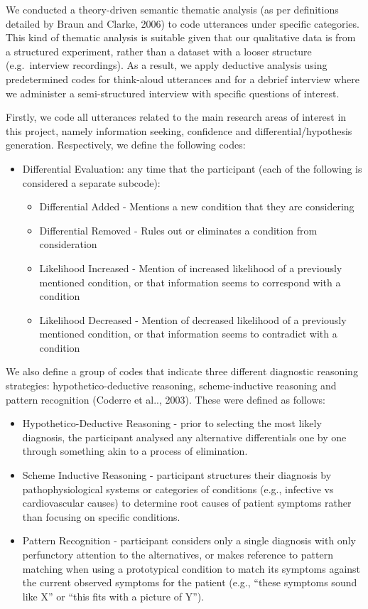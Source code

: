 \documentclass[a4paper, nobind]{templates/ociamthesis}
\providecommand{\tightlist}{%
  \setlength{\itemsep}{0pt}\setlength{\parskip}{0pt}}
\begin{document}
We conducted a theory-driven semantic thematic analysis (as per definitions detailed by Braun and Clarke, 2006) to code utterances under specific categories. This kind of thematic analysis is suitable given that our qualitative data is from a structured experiment, rather than a dataset with a looser structure (e.g.~interview recordings). As a result, we apply deductive analysis using predetermined codes for think-aloud utterances and for a debrief interview where we administer a semi-structured interview with specific questions of interest.

Firstly, we code all utterances related to the main research areas of interest in this project, namely information seeking, confidence and differential/hypothesis generation. Respectively, we define the following codes:

\begin{itemize}
\tightlist
\item
  Differential Evaluation: any time that the participant (each of the following is considered a separate subcode):

  \begin{itemize}
  \tightlist
  \item
    Differential Added - Mentions a new condition that they are considering
  \item
    Differential Removed - Rules out or eliminates a condition from consideration
  \item
    Likelihood Increased - Mention of increased likelihood of a previously mentioned condition, or that information seems to correspond with a condition
  \item
    Likelihood Decreased - Mention of decreased likelihood of a previously mentioned condition, or that information seems to contradict with a condition
  \end{itemize}
\end{itemize}

We also define a group of codes that indicate three different diagnostic reasoning strategies: hypothetico-deductive reasoning, scheme-inductive reasoning and pattern recognition (Coderre et al.., 2003). These were defined as follows:

\begin{itemize}
\tightlist
\item
  Hypothetico-Deductive Reasoning - prior to selecting the most likely diagnosis, the participant analysed any alternative differentials one by one through something akin to a process of elimination.
\item
  Scheme Inductive Reasoning - participant structures their diagnosis by pathophysiological systems or categories of conditions (e.g., infective vs cardiovascular causes) to determine root causes of patient symptoms rather than focusing on specific conditions.
\item
  Pattern Recognition - participant considers only a single diagnosis with only perfunctory attention to the alternatives, or makes reference to pattern matching when using a prototypical condition to match its symptoms against the current observed symptoms for the patient (e.g., ``these symptoms sound like X'' or ``this fits with a picture of Y'').
\end{itemize}
\end{document}
